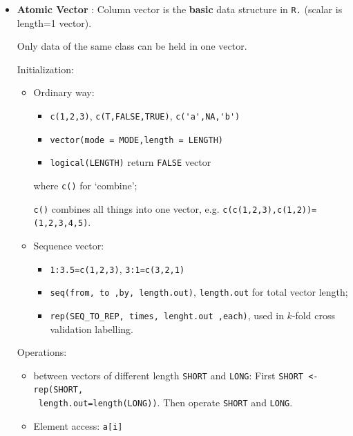 \begin{itemize}[topsep=2pt,itemsep=0pt]
    \item \textbf{Atomic Vector} : Column vector is the \textbf{basic} data structure in \lstinline|R.| (scalar is length=1 vector).
    
    Only data of the same class can be held in one vector.
    
    Initialization:
    \begin{itemize}[topsep=2pt,itemsep=0pt]
        \item Ordinary way: 
        \begin{itemize}[topsep=2pt,itemsep=0pt]
            \item \lstinline|c(1,2,3)|, \lstinline|c(T,FALSE,TRUE)|, \lstinline|c('a',NA,'b')|
            \item \lstinline|vector(mode = MODE,length = LENGTH)|
            \item \lstinline|logical(LENGTH)| return \lstinline|FALSE| vector 
        \end{itemize}
        
        where \lstinline|c()| for `combine'; 
        
        \lstinline|c()| combines all things into one vector, e.g. \lstinline|c(c(1,2,3),c(1,2))=(1,2,3,4,5)|.
        \item Sequence vector: 
        \begin{itemize}[topsep=2pt,itemsep=0pt]
            \item \lstinline|1:3.5=c(1,2,3)|, \lstinline|3:1=c(3,2,1)|
            \item \lstinline|seq(from, to ,by, length.out)|, \lstinline|length.out| for total vector length;
            \item \lstinline|rep(SEQ_TO_REP, times, lenght.out ,each)|, used in $ k $-fold cross validation labelling.
        \end{itemize}
    \end{itemize}
    
    Operations:
    \begin{itemize}[topsep=2pt,itemsep=0pt]
        \item between vectors of different length \lstinline|SHORT| and \lstinline|LONG|: First \lstinline|SHORT <- rep(SHORT,|\\\lstinline| length.out=length(LONG))|. Then operate \lstinline|SHORT| and \lstinline|LONG|.
        \item Element access: \lstinline|a[i]|
    \end{itemize}
    

\end{itemize}
